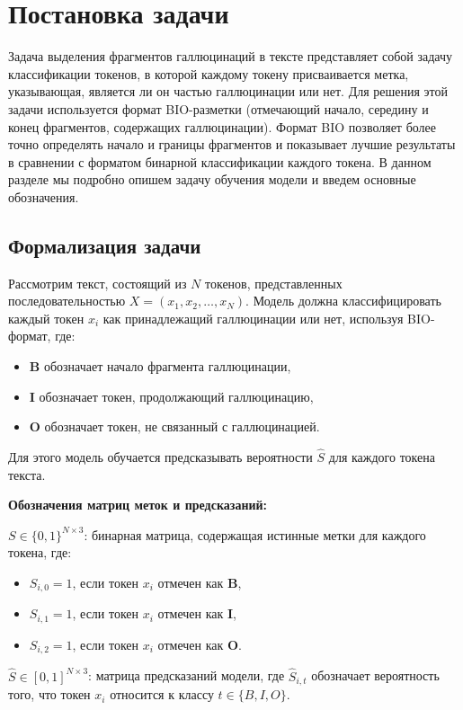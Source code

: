 \documentclass[12pt]{article}
\begin{document}
\clearpage
\section{Постановка задачи}

Задача выделения фрагментов галлюцинаций в тексте представляет собой задачу классификации токенов, в которой каждому токену присваивается метка, указывающая, является ли он частью галлюцинации или нет. Для решения этой задачи используется формат BIO-разметки (отмечающий начало, середину и конец фрагментов, содержащих галлюцинации). Формат BIO позволяет более точно определять начало и границы фрагментов и показывает лучшие результаты в сравнении с форматом бинарной классификации каждого токена. В данном разделе мы подробно опишем задачу обучения модели и введем основные обозначения.

\subsection*{Формализация задачи}

Рассмотрим текст, состоящий из \( N \) токенов, представленных последовательностью \( X = (x_1, x_2, \ldots, x_N) \). Модель должна классифицировать каждый токен \( x_i \) как принадлежащий галлюцинации или нет, используя BIO-формат, где:
\begin{itemize}
\item \textbf{B} обозначает начало фрагмента галлюцинации,
\item \textbf{I} обозначает токен, продолжающий галлюцинацию,
\item \textbf{O} обозначает токен, не связанный с галлюцинацией.
\end{itemize}
Для этого модель обучается предсказывать вероятности \( \hat{S} \) для каждого токена текста.

\textbf{Обозначения матриц меток и предсказаний:}

\( S \in \{0, 1\}^{N \times 3} \): бинарная матрица, содержащая истинные метки для каждого токена, где:
   \begin{itemize}
     \item \( S_{i,0} = 1 \), если токен \( x_i \) отмечен как \textbf{B},
     \item \( S_{i,1} = 1 \), если токен \( x_i \) отмечен как \textbf{I},
     \item \( S_{i,2} = 1 \), если токен \( x_i \) отмечен как \textbf{O}.
   \end{itemize}
\( \hat{S} \in [0, 1]^{N \times 3} \): матрица предсказаний модели, где \( \hat{S}_{i,t} \) обозначает вероятность того, что токен \( x_i \) относится к классу \( t \in \{ B, I, O \} \).
\end{document}
